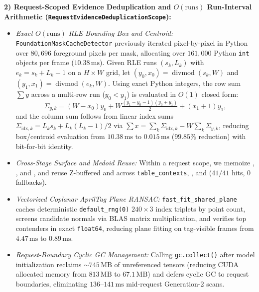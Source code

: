 \documentclass[10pt,journal]{IEEEtran}
\begin{document}
\textbf{2) Request-Scoped Evidence Deduplication and $O(\text{runs})$ Run-Interval Arithmetic (\texttt{RequestEvidenceDeduplicationScope}):}
\begin{itemize}
    \item \emph{Exact $O(\text{runs})$ RLE Bounding Box and Centroid:} \texttt{FoundationMaskCacheDetector} previously iterated pixel-by-pixel in Python over $80{,}696$ foreground pixels per mask, allocating over $161{,}000$ Python \texttt{int} objects per frame ($10.38\,\mathrm{ms}$). Given RLE runs $(s_k,L_k)$ with $e_k=s_k+L_k-1$ on a $H\times W$ grid, let $(y_0,x_0)=\operatorname{divmod}(s_k,W)$ and $(y_1,x_1)=\operatorname{divmod}(e_k,W)$. Using exact Python integers, the row sum $\sum y$ across a multi-row run ($y_0<y_1$) is evaluated in $O(1)$ closed form:
    \begin{equation}
        \Sigma_{y,k}=(W-x_0)y_0+W\tfrac{(y_1-y_0-1)(y_0+y_1)}{2}+(x_1+1)y_1,
        \label{eq:rle_sum_y}
    \end{equation}
    and the column sum follows from linear index sums $\Sigma_{\mathrm{idx},k}=L_k s_k+L_k(L_k-1)/2$ via $\sum x=\sum_k\Sigma_{\mathrm{idx},k}-W\sum_k\Sigma_{y,k}$, reducing box/centroid evaluation from $10.38\,\mathrm{ms}$ to $0.015\,\mathrm{ms}$ ($99.85\%$ reduction) with bit-for-bit identity.
    \item \emph{Cross-Stage Surface and Medoid Reuse:} Within a request scope, we memoize , , and , and reuse Z-buffered  and  across \texttt{table\_contexts}, , and  ($41/41$ hits, $0$ fallbacks).
    \item \emph{Vectorized Coplanar AprilTag Plane RANSAC:} \texttt{fast\_fit\_shared\_plane} caches deterministic \texttt{default\_rng(0)} $240\times 3$ index triplets by point count, screens candidate normals via BLAS matrix multiplication, and verifies top contenders in exact \texttt{float64}, reducing plane fitting on tag-visible frames from $4.47\,\mathrm{ms}$ to $0.89\,\mathrm{ms}$.
    \item \emph{Request-Boundary Cyclic GC Management:} Calling \texttt{gc.collect()} after model initialization reclaims $\sim 745\,\mathrm{MB}$ of unreferenced tensors (reducing CUDA allocated memory from $813\,\mathrm{MB}$ to $67.1\,\mathrm{MB}$) and defers cyclic GC to request boundaries, eliminating $136$--$141\,\mathrm{ms}$ mid-request Generation-2 scans.
\end{itemize}
\end{document}
